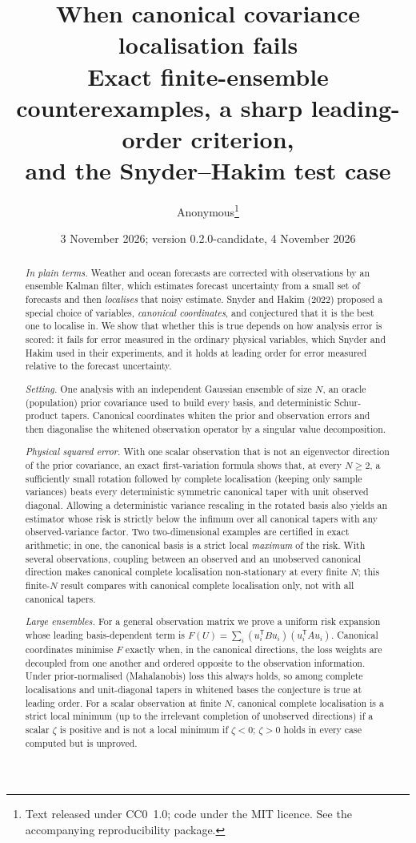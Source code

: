 \documentclass[11pt,a4paper]{article}
\title{\textbf{When canonical covariance localisation fails}\\[6pt]
 \large Exact finite-ensemble counterexamples, a sharp leading-order criterion,\\
 and the Snyder--Hakim test case}
\author{Anonymous\thanks{Text released under CC0~1.0; code under the MIT licence.
 See the accompanying reproducibility package.}}
\date{3 November 2026; version 0.2.0-candidate, 4 November 2026}
\numberwithin{equation}{section}
\theoremstyle{remark}\newtheorem{remark}[theorem]{Remark}
\newcommand{\T}{^{\mathsf T}}
\begin{document}
\maketitle

\begin{abstract}
\emph{In plain terms.} Weather and ocean forecasts are corrected with observations by an
ensemble Kalman filter, which estimates forecast uncertainty from a small set of forecasts and
then \emph{localises} that noisy estimate. Snyder and Hakim (2022) proposed a special choice of
variables, \emph{canonical coordinates}, and conjectured that it is the best one to localise in.
We show that whether this is true depends on how analysis error is scored: it fails for error
measured in the ordinary physical variables, which Snyder and Hakim used in their experiments,
and it holds at leading order for error measured relative to the forecast uncertainty.

\emph{Setting.} One analysis with an independent Gaussian ensemble of size \(N\), an oracle
(population) prior covariance used to build every basis, and deterministic Schur-product
tapers. Canonical coordinates whiten the prior and observation errors and then diagonalise the
whitened observation operator by a singular value decomposition.

\emph{Physical squared error.} With one scalar observation that is not an eigenvector
direction of the prior covariance, an exact first-variation formula shows that, at every
\(N\ge2\), a sufficiently small rotation followed by complete localisation (keeping only
sample variances) beats every deterministic symmetric canonical taper with unit observed
diagonal. Allowing a deterministic variance rescaling in the rotated basis also yields an
estimator whose risk is strictly below the infimum over all canonical tapers with any
observed-variance factor. Two two-dimensional examples are certified in exact arithmetic; in
one, the canonical basis is a strict local \emph{maximum} of the risk. With several
observations, coupling between an observed and an unobserved canonical direction makes
canonical complete localisation non-stationary at every finite \(N\); this finite-\(N\) result
compares with canonical complete localisation only, not with all canonical tapers.

\emph{Large ensembles.} For a general observation matrix we prove a uniform risk expansion
whose leading basis-dependent term is \(F(U)=\sum_i(u_i\T Bu_i)(u_i\T Au_i)\). Canonical
coordinates minimise \(F\) exactly when, in the canonical directions, the loss weights are
decoupled from one another and ordered opposite to the observation information. Under prior-normalised
(Mahalanobis) loss this always holds, so among complete localisations and unit-diagonal
tapers in whitened bases the conjecture is true at leading order. For a scalar observation
at finite \(N\), canonical complete localisation is a strict local minimum (up to the
irrelevant completion of unobserved directions) if a scalar \(\zeta\) is positive and is not
a local minimum if \(\zeta<0\); \(\zeta>0\) holds in every case computed but is unproved.


\end{abstract}
\end{document}
